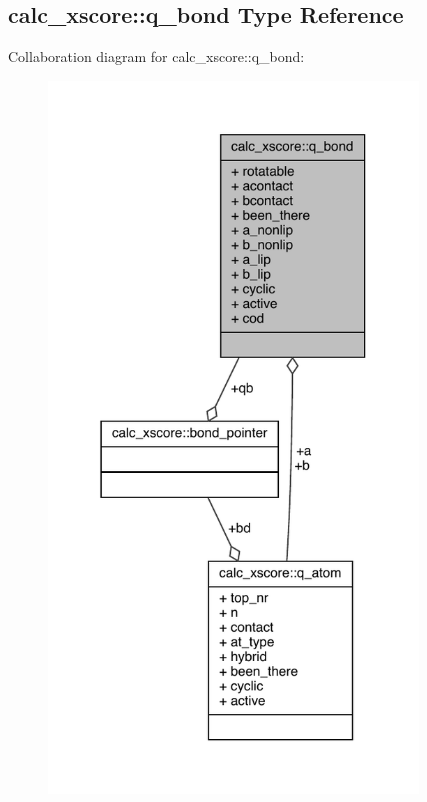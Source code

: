 \hypertarget{structcalc__xscore_1_1q__bond}{\subsection{calc\-\_\-xscore\-:\-:q\-\_\-bond Type Reference}
\label{structcalc__xscore_1_1q__bond}
}


Collaboration diagram for calc\-\_\-xscore\-:\-:q\-\_\-bond\-:
\nopagebreak
\begin{figure}[H]
\begin{center}
\leavevmode
\includegraphics[width=278pt]{structcalc__xscore_1_1q__bond__coll__graph}
\end{center}
\end{figure}
